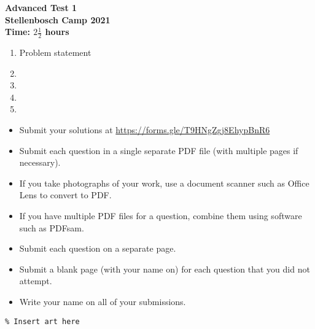 \documentclass{article}
\begin{document}
\thispagestyle{empty}

\begin{center}
  \textbf{\Large Advanced Test 1}
  \\ \vspace{1em}
  \textbf{\large Stellenbosch Camp 2021}
  \\ \vspace{1em}
  \textbf{\large Time: $2\frac{1}{2}$ hours}
\end{center}

\vspace{24pt}

\begin{enumerate}[1.]

\item %
Problem statement


\item %


\item %


\item %


\item %

\end{enumerate}


\vfill
\begin{itemize}
	\item Submit your solutions at \href{https://forms.gle/T9HNgZgj8EhypBnR6}{https://forms.gle/T9HNgZgj8EhypBnR6}
	\item Submit each question in a single separate PDF file (with multiple pages if necessary).
	\item If you take photographs of your work, use a document scanner such as Office Lens to convert to PDF.
	\item If you have multiple PDF files for a question, combine them using software such as PDFsam.
\end{itemize}

\begin{itemize}
  \item Submit each question on a separate page.
  \item Submit a blank page (with your name on) for each question that you did not attempt.
  \item Write your name on all of your submissions.
\end{itemize}

\vfill
\centering
\begin{BVerbatim}
\end{BVerbatim}
\end{document}
